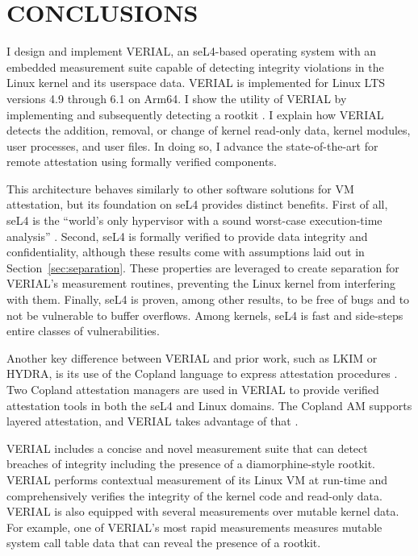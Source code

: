 \documentclass[a4paper,twoside]{article}
\begin{document}
\section{\uppercase{Conclusions}} %
\label{sec:conclusion}
I design and implement VERIAL, an seL4-based operating system with an embedded measurement suite capable of detecting integrity violations in the Linux kernel and its userspace data. VERIAL is implemented for Linux LTS versions 4.9 through 6.1 on Arm64. I show the utility of VERIAL by implementing and subsequently detecting a rootkit \cite{diamorphine}. I explain how VERIAL detects the addition, removal, or change of kernel read-only data, kernel modules, user processes, and user files. In doing so, I advance the state-of-the-art for remote attestation using formally verified components.

This architecture behaves similarly to other software solutions for VM attestation, but its foundation on seL4 provides distinct benefits. First of all, seL4 is the ``world's only hypervisor with a sound worst-case execution-time analysis'' \cite{seL4FAQ}. Second, seL4 is formally verified to provide data integrity and confidentiality, although these results come with assumptions laid out in Section~\ref{sec:separation}. These properties are leveraged to create separation for VERIAL's measurement routines, preventing the Linux kernel from interfering with them. Finally, seL4 is proven, among other results, to be free of bugs and to not be vulnerable to buffer overflows. Among kernels, seL4 is fast and side-steps entire classes of vulnerabilities.

Another key difference between VERIAL and prior work, such as LKIM or HYDRA, is its use of the Copland language to express attestation procedures \cite{LKIMsmall, HYDRA, copland-lang}. Two Copland attestation managers are used in VERIAL to provide verified attestation tools in both the seL4 and Linux domains. The Copland AM supports layered attestation, and VERIAL takes advantage of that \cite{petz2022innovations}.

VERIAL includes a concise and novel measurement suite that can detect breaches of integrity including the presence of a diamorphine-style rootkit. VERIAL performs contextual measurement of its Linux VM at run-time and comprehensively verifies the integrity of the kernel code and read-only data. VERIAL is also equipped with several measurements over mutable kernel data. For example, one of VERIAL's most rapid measurements measures mutable system call table data that can reveal the presence of a rootkit.
\end{document}
